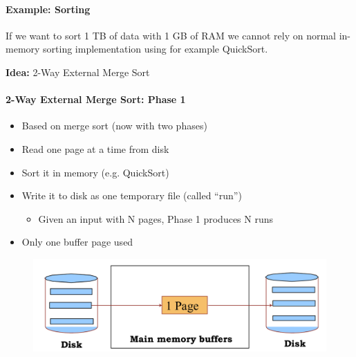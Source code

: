 \paragraph{Example: Sorting}
If we want to sort 1 TB of data with 1 GB of RAM we
cannot rely on normal in-memory sorting implementation
using for example QuickSort.

\textbf{Idea:} 2-Way External Merge Sort


\paragraph{2-Way External Merge Sort: Phase 1}
\begin{itemize}
\item Based on merge sort (now with two phases)
\item Read one page at a time from disk
\item Sort it in memory (e.g. QuickSort)
\item Write it to disk as one temporary file (called ``run'')
  \begin{itemize}
  \item Given an input with N pages, Phase 1 produces N runs
  \end{itemize}
\item Only one buffer page used
\end{itemize}

\begin{figure}[h]
  \begin{minipage}{1.0\linewidth}
    \begin{center}
      \includegraphics[scale=0.17]{graphics/external-msort-v1}
    \end{center}
  \end{minipage}
\end{figure}

